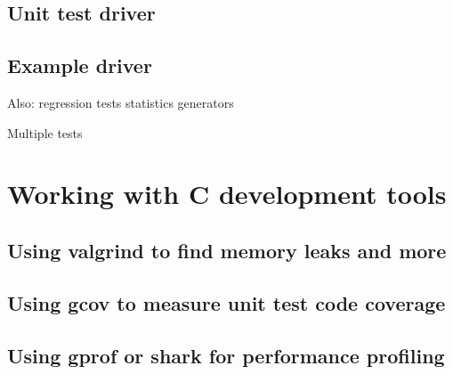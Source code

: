 \subsection{Unit test driver}

\subsection{Example driver}

Also:
  regression tests
  statistics generators

Multiple tests

\section{Working with C development tools}

\subsection{Using valgrind to find memory leaks and more}

\subsection{Using gcov to measure unit test code coverage}

\subsection{Using gprof or shark for performance profiling}



